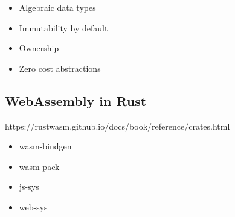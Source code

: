 \begin{itemize}
	\item Algebraic data types
	\item Immutability by default
	\item Ownership
	\item Zero cost abstractions
\end{itemize}

\subsection{WebAssembly in Rust}%
\label{sub:wasm_in_rust}

https://rustwasm.github.io/docs/book/reference/crates.html

\begin{itemize}
	\item wasm-bindgen
	\item wasm-pack
	\item js-sys
	\item web-sys
\end{itemize}
